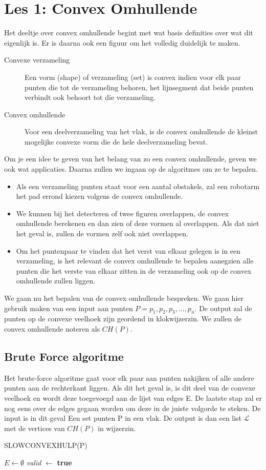 \documentclass[12pt,a4paper]{article}
\begin{document}
	\section{Les 1: Convex Omhullende}
	Het deeltje over convex omhullende begint met wat basis definities over wat dit eigenlijk is. Er is daarna ook een figuur om het volledig duidelijk te maken. 
		\begin{description}
			\item[Convexe verzameling] Een vorm (shape) of verzameling (set) is convex indien voor elk paar punten die tot de verzameling behoren, het lijnsegment dat beide punten verbindt ook behoort tot die verzameling. 
			\item[Convex omhullende] Voor een deelverzameling van het vlak, is de convex omhullende de kleinst mogelijke convexe vorm die de hele deelverzameling bevat. 
		\end{description}
	Om je een idee te geven van het belang van zo een convex omhullende, geven we ook wat applicaties. Daarna zullen we ingaan op de algoritmes om ze te bepalen. 
		\begin{itemize}
			\item Als een verzameling punten staat voor een aantal obstakels, zal een robotarm het pad 	errond kiezen volgens de convex omhullende. 
			\item We kunnen bij het detecteren of twee figuren overlappen, de convex omhullende berekenen en dan zien of deze vormen al overlappen. Als dat niet het geval is, zullen de vormen zelf ook niet overlappen. 
			\item Om het puntenpaar te vinden dat het verst van elkaar gelegen is in een verzameling, is het relevant de convex omhullende te bepalen aanegzien alle punten die het verste van elkaar zitten in de verzameling ook op de convex omhullende zullen liggen. 
		\end{itemize}
	We gaan nu het bepalen van de convex omhullende bespreken. We gaan hier gebruik maken van een input aan punten \(P = {p_1, p_2, p_3, ..., p_n}\). De output zal de punten op de convexe veelhoek zijn geordend in klokwijzerzin. We zullen de convex omhullende noteren als $CH(P)$.
	\subsection{Brute Force algoritme}
	Het brute-force algoritme gaat voor elk paar aan punten nakijken of alle andere punten aan de rechterkant liggen. Als dit het geval is, is dit deel van de convexe veelhoek en wordt deze toegevoegd aan de lijst van edges E. De laatste stap zal er nog eens over de edges gegaan worden om deze in de juiste volgorde te steken. 
	De input is in dit geval Een set punten P in een vlak. De output is dan een list $\mathcal{L}$ met de vertices van $CH(P)$ in wijzerzin. 
		\begin{algorithm}
			\caption{SLOWCONVEXHULP(P)}
			\begin{algorithmic}[1]
				\State $E \gets \emptyset$
					\State \textit{valid} $\gets$ \textbf{true}
				\EndFor
			\end{algorithmic}
		\end{algorithm}
\end{document}

